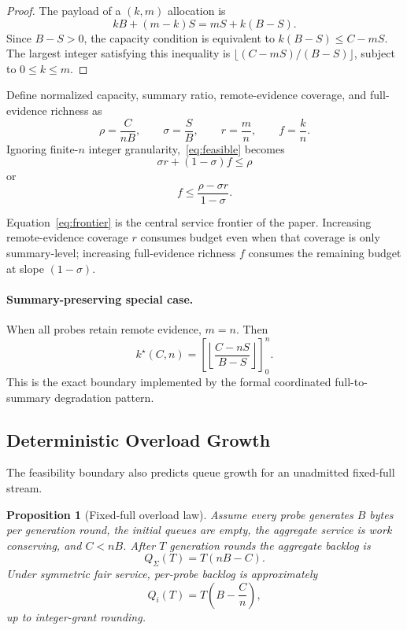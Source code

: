 \documentclass[10pt,journal]{IEEEtran}
\newtheorem{proposition}{Proposition}
\begin{document}
\begin{proof}
The payload of a $(k,m)$ allocation is
\[
kB+(m-k)S=mS+k(B-S).
\]
Since $B-S>0$, the capacity condition is equivalent to
$k(B-S)\leq C-mS$. The largest integer satisfying this inequality is
$\lfloor(C-mS)/(B-S)\rfloor$, subject to $0\leq k\leq m$.
\end{proof}

Define normalized capacity, summary ratio, remote-evidence coverage, and
full-evidence richness as
\begin{equation}
\rho=\frac{C}{nB},
\qquad
\sigma=\frac{S}{B},
\qquad
r=\frac{m}{n},
\qquad
f=\frac{k}{n}.
\end{equation}
Ignoring finite-$n$ integer granularity,~\eqref{eq:feasible} becomes
\begin{equation}
\boxed{
\sigma r+(1-\sigma)f\leq\rho
}
\label{eq:frontier}
\end{equation}
or
\begin{equation}
f\leq\frac{\rho-\sigma r}{1-\sigma}.
\label{eq:frontier2}
\end{equation}

Equation~\eqref{eq:frontier} is the central service frontier of the
paper. Increasing remote-evidence coverage $r$ consumes budget even when
that coverage is only summary-level; increasing full-evidence richness
$f$ consumes the remaining budget at slope $(1-\sigma)$.

\paragraph{Summary-preserving special case.}
When all probes retain remote evidence, $m=n$. Then
\begin{equation}
k^\star(C,n)
=
\left[
\left\lfloor
\frac{C-nS}{B-S}
\right\rfloor
\right]_0^n .
\label{eq:summarypreserving}
\end{equation}
This is the exact boundary implemented by the formal coordinated
full-to-summary degradation pattern.

\subsection{Deterministic Overload Growth}

The feasibility boundary also predicts queue growth for an unadmitted
fixed-full stream.

\begin{proposition}[Fixed-full overload law]
\label{prop:overload}
Assume every probe generates $B$ bytes per generation round, the initial
queues are empty, the aggregate service is work conserving, and
$C<nB$. After $T$ generation rounds the aggregate backlog is
\begin{equation}
Q_\Sigma(T)=T(nB-C).
\label{eq:overload}
\end{equation}
Under symmetric fair service, per-probe backlog is
approximately
\begin{equation}
Q_i(T)
=
T\left(B-\frac{C}{n}\right),
\label{eq:overload_probe}
\end{equation}
up to integer-grant rounding.
\end{proposition}
\end{document}
